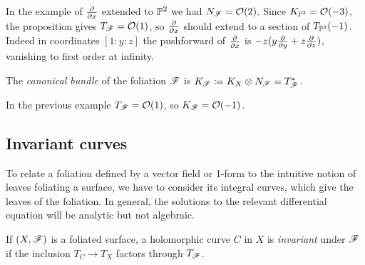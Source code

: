 \begin{example}\label{ex:P2 tangent}
    In the example of $\pdv{}{x}$ extended to $\P^2$ we had $N_\scrF=\O(2)$.
    Since $K_{\P^2}=\O(-3)$, the proposition gives $T_\scrF=\O(1)$, so
    $\pdv{}{x}$ should extend to a section of $T_{\P^2}(-1)$. Indeed in
    coordinates $[1:y:z]$ the pushforward of $\pdv{}{x}$ is
    $-z(y\pdv{}{y}+z\pdv{}{z})$, vanishing to first order at infinity.
\end{example}

\begin{definition}
    The \emph{canonical bundle} of the foliation $\scrF$ is
    $K_\scrF\coloneqq K_X\otimes N_\scrF=T_\scrF^*$.
\end{definition}

\begin{example}
    In the previous example $T_\scrF=\O(1)$, so $K_\scrF=\O(-1)$.
\end{example}

\subsection{Invariant curves}

To relate a foliation defined by a vector field or 1-form to the intuitive
notion of leaves foliating a surface, we have to consider its integral curves,
which give the leaves of the foliation. In general, the solutions to the
relevant differential equation will be analytic but not algebraic.

\begin{definition}
    If $(X,\scrF)$ is a foliated surface, a holomorphic curve $C$ in $X$ is
    \emph{invariant} under $\scrF$ if the inclusion $T_C\to T_X$ factors through
    $T_\scrF$.
\end{definition}

